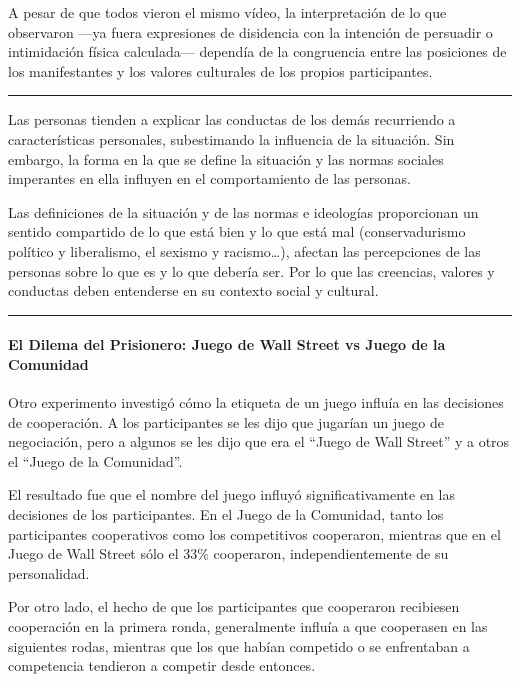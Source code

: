 \documentclass[
]{website}
\begin{document}
A pesar de que todos vieron el mismo vídeo, la interpretación de lo que observaron ---ya fuera expresiones de disidencia con la intención de persuadir o intimidación física calculada--- dependía de la congruencia entre las posiciones de los manifestantes y los valores culturales de los propios participantes.

\begin{center}\rule{0.5\linewidth}{0.5pt}\end{center}

Las personas tienden a explicar las conductas de los demás recurriendo a características personales, subestimando la influencia de la situación. Sin embargo, la forma en la que se define la situación y las normas sociales imperantes en ella influyen en el comportamiento de las personas.

Las definiciones de la situación y de las normas e ideologías proporcionan un sentido compartido de lo que está bien y lo que está mal (conservadurismo político y liberalismo, el sexismo y racismo\ldots), afectan las percepciones de las personas sobre lo que es y lo que debería ser. Por lo que las creencias, valores y conductas deben entenderse en su contexto social y cultural.

\begin{center}\rule{0.5\linewidth}{0.5pt}\end{center}

\paragraph*{El Dilema del Prisionero: Juego de Wall Street vs Juego de la Comunidad}\label{el-dilema-del-prisionero-juego-de-wall-street-vs-juego-de-la-comunidad}

Otro experimento investigó cómo la etiqueta de un juego influía en las decisiones de cooperación. A los participantes se les dijo que jugarían un juego de negociación, pero a algunos se les dijo que era el ``Juego de Wall Street'' y a otros el ``Juego de la Comunidad''.

El resultado fue que el nombre del juego influyó significativamente en las decisiones de los participantes. En el Juego de la Comunidad, tanto los participantes cooperativos como los competitivos cooperaron, mientras que en el Juego de Wall Street sólo el 33\% cooperaron, independientemente de su personalidad.

Por otro lado, el hecho de que los participantes que cooperaron recibiesen cooperación en la primera ronda, generalmente influía a que cooperasen en las siguientes rodas, mientras que los que habían competido o se enfrentaban a competencia tendieron a competir desde entonces.
\end{document}
